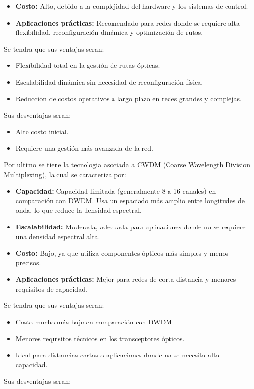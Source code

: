 \begin{itemize}
\begin{itemize}
    	\item \textbf{Costo:} Alto, debido a la complejidad del hardware y los sistemas de control.
    	\item \textbf{Aplicaciones prácticas:} Recomendado para redes donde se requiere alta flexibilidad, reconfiguración dinámica y optimización de rutas.
	\end{itemize}
	Se tendra que sus ventajas seran:	
	\begin{itemize}
    	\item Flexibilidad total en la gestión de rutas ópticas.
    	\item Escalabilidad dinámica sin necesidad de reconfiguración física.
    	\item Reducción de costos operativos a largo plazo en redes grandes y complejas.
	\end{itemize}
	Sus desventajas seran:	
	\begin{itemize}
    	\item Alto costo inicial.
    	\item Requiere una gestión más avanzada de la red.
	\end{itemize}
	Por ultimo se tiene la tecnologia asociada a CWDM (Coarse Wavelength Division Multiplexing), la cual se caracteriza por:
	\begin{itemize}
    	\item \textbf{Capacidad:} Capacidad limitada (generalmente 8 a 16 canales) en comparación con DWDM. Usa un espaciado más amplio entre longitudes de onda, lo que reduce la densidad espectral.
    	\item \textbf{Escalabilidad:} Moderada, adecuada para aplicaciones donde no se requiere una densidad espectral alta.
    	\item \textbf{Costo:} Bajo, ya que utiliza componentes ópticos más simples y menos precisos.
    	\item \textbf{Aplicaciones prácticas:} Mejor para redes de corta distancia y menores requisitos de capacidad.
	\end{itemize}
	Se tendra que sus ventajas seran:
	\begin{itemize}
    	\item Costo mucho más bajo en comparación con DWDM.
    	\item Menores requisitos técnicos en los transceptores ópticos.
    	\item Ideal para distancias cortas o aplicaciones donde no se necesita alta capacidad.
	\end{itemize}
	Sus desventajas seran:

\end{itemize}
